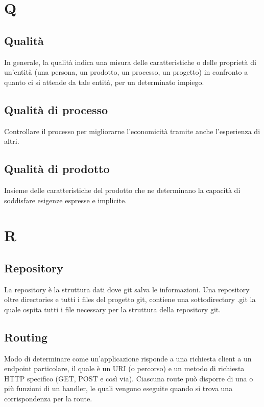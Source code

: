 {	\section{Q}
	\subsection{Qualità} 
	In generale, la qualità indica una misura delle caratteristiche o delle proprietà di un'entità (una persona, un prodotto, un processo, un progetto) in confronto a quanto ci si attende da tale entità, per un determinato impiego.
	
	\subsection{Qualità di processo}
	Controllare il processo per migliorarne l'economicità tramite anche l'esperienza di altri.
	
	\subsection{Qualità di prodotto}
	Insieme delle caratteristiche del prodotto che ne determinano la capacità di soddisfare esigenze espresse e implicite.
	
	
	\section{R}
	\subsection{Repository} 
	La repository è la struttura dati dove git salva le informazioni. Una repository oltre directories e tutti i files del progetto git, contiene una sottodirectory .git la quale ospita tutti i file necessary per la struttura della repository git.
	
	\subsection{Routing} 
	Modo di determinare come un’applicazione risponde a una richiesta client a un endpoint particolare, il quale è un URI (o percorso) e un metodo di richiesta HTTP specifico (GET, POST e così via). Ciascuna route può disporre di una o più funzioni di un handler, le quali vengono eseguite quando si trova una corrispondenza per la route.
	
}
